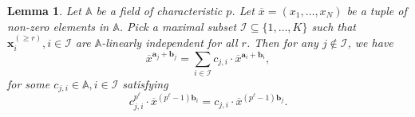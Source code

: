 \documentclass[letterpaper, 11pt, thm-restate]{article}
\numberwithin{equation}{section}
\newcommand{\A}{\mathbb{A}}
\newcommand{\mI}{\mathcal{I}}
\newcommand{\ba}{\boldsymbol{a}}
\newcommand{\bb}{\boldsymbol{b}}
\newcommand{\bx}{\boldsymbol{x}}
\newcommand{\ox}{\overline{x}}
\newtheorem{lem}[thrm]{Lemma}
\theoremstyle{definition}
\theoremstyle{definition}
\theoremstyle{definition}
\begin{document}
\begin{lem}\label{lem:lindepmodp}
    Let $\A$ be a field of characteristic $p$.
    Let $\ox = (x_1, \ldots, x_N)$ be a tuple of non-zero elements in $\A$.
    Pick a maximal subset $\mI \subseteq \{1, \ldots, K\}$ such that $\bx_i^{(\geq r)}, i \in \mI$ are $\A$-linearly independent for all $r$.
    Then for any $j \notin \mI$, we have
    \begin{equation}\label{eq:linconda}
        \ox^{\ba_j + \bb_j} = \sum_{i \in \mI} c_{j,i} \cdot \ox^{\ba_i + \bb_i},
    \end{equation}
    for some $c_{j,i} \in \A, i \in \mI$ satisfying
    \begin{equation}\label{eq:lincondc}
        c_{j,i}^{p^{\ell}} \cdot \ox^{(p^{\ell} - 1) \bb_i} = c_{j,i} \cdot \ox^{(p^{\ell}-1)\bb_j}.
    \end{equation}
\end{lem}
\end{document}
